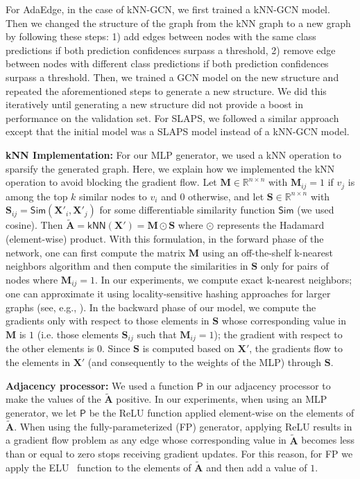 \documentclass{article}
\def\mA{{\bm{A}}}
\def\mM{{\bm{M}}}
\def\mS{{\bm{S}}}
\def\mX{{\bm{X}}}
\newcommand{\func}[1]{\ensuremath{\mathsf{#1}}}
\begin{document}
For AdaEdge, in the case of kNN-GCN, we first trained a kNN-GCN model. Then we changed the structure of the graph from the kNN graph to a new graph by following these steps: 1) add edges between nodes with the same class predictions if both prediction confidences surpass a threshold, 2) remove edge between nodes with different class predictions if both prediction confidences surpass a threshold. Then, we trained a GCN model on the new structure and repeated the aforementioned steps to generate a new structure. We did this iteratively until generating a new structure did not provide a boost in performance on the validation set. For SLAPS, we followed a similar approach except that the initial model was a SLAPS model instead of a kNN-GCN model.

\textbf{kNN Implementation:} For our MLP generator, we used a kNN operation to sparsify the generated graph. Here, we explain how we implemented the kNN operation to avoid blocking the gradient flow. Let $\mM\in\mathbb{R}^{n\times n}$ with $\mM_{ij}=1$ if $v_j$ is among the top $k$ similar nodes to $v_i$ and $0$ otherwise, and let $\mS\in\mathbb{R}^{n\times n}$ with $\mS_{ij} = \func{Sim}(\mX'_i, \mX'_j)$ for some differentiable similarity function $\func{Sim}$ (we used cosine). Then  $\tilde{\mA}=\func{kNN}(\mX')=\mM\odot\mS$ where $\odot$ represents the Hadamard (element-wise) product. With this formulation, in the forward phase of the network, one can first compute the matrix $\mM$ using an off-the-shelf k-nearest neighbors algorithm and then compute the similarities in $\mS$ only for pairs of nodes where $\mM_{ij}=1$. In our experiments, we compute exact k-nearest neighbors; one can approximate it using locality-sensitive
hashing approaches for larger graphs (see, e.g., \cite{halcrow2020grale,kitaev2020reformer}). In the backward phase of our model, we compute the gradients only with respect to those elements in $\mS$ whose corresponding value in $\mM$ is $1$ (i.e. those elements $\mS_{ij}$ such that $\mM_{ij}=1$); the gradient with respect to the other elements is $0$.
Since $\mS$ is computed based on $\mX'$, the gradients flow to the elements in $\mX'$ (and consequently to the weights of the MLP) through $\mS$. 

\textbf{Adjacency processor:} We used a function $\func{P}$ in our adjacency processor to make the values of the $\tilde{\mA}$ positive. In our experiments, when using an MLP generator, we let $\func{P}$ be the ReLU function applied element-wise on the elements of $\tilde{\mA}$. When using the fully-parameterized (FP) generator, applying ReLU results in a gradient flow problem as any edge whose corresponding value in $\tilde{\mA}$ becomes less than or equal to zero stops receiving gradient updates. For this reason, for FP we apply the ELU~\cite{elu} function to the elements of $\tilde{\mA}$ and then add a value of $1$.
\end{document}
